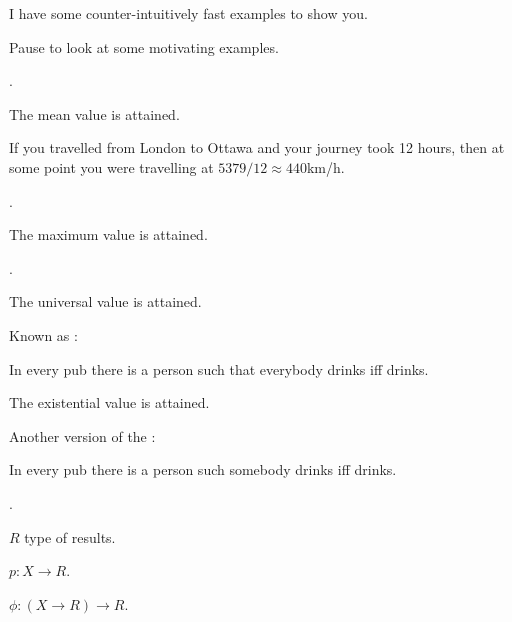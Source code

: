 \documentclass%
[%
Screen4to3,
]{foils}
\begin{document}

I have some counter-intuitively fast examples to show you.



Pause to look at some motivating examples.


.

\vfill

The mean value is attained.

\vfill

\noindent
If you travelled from London to Ottawa and your journey took 12 hours,
then at some point you were travelling at $5379 / 12 \approx 440$km/h.



.

\vfill

The maximum value is attained.


.

\vfill

The universal value is attained. 

\vfill

Known as : 

In every pub there is a 
person  such that everybody drinks iff  drinks.



\vfill

The existential value is attained. 

\vfill

Another version of the : 

In every pub there is a 
person  such somebody drinks iff  drinks.


.

$R$ type of results.

$p \colon X \to R$.

$\phi \colon (X \to R) \to R$. \qquad {}
\end{document}
